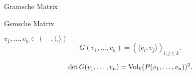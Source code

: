 \documentclass[class=article, crop=false]{standalone}
\begin{document}
\begin{zettel}{Gramsche Matrix}
\begin{flashcard}[1wnflczi]{Gsmsche Matrix}
	\begin{definition}

		$v_1,\dots,v_n \in  (\quad, \langle .\rangle)$
		\[
			G (v_1,\dots,v_n) = ( \langle v_i,v_j\rangle)_{i,j\leq k}
		.\]

	\end{definition}

\end{flashcard}

\begin{theorem}
	\[
		\det G (v_1,\dots,v_n) = \operatorname{Vol}_k(P(v_1,\dots,v_n))^2
	.\]
\end{theorem}
\end{zettel}
\end{document}
